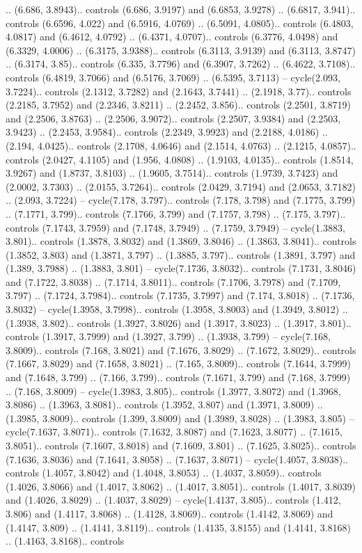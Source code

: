 .. (6.686, 3.8943).. controls (6.686, 3.9197) and (6.6853, 3.9278) .. (6.6817, 3.941).. controls (6.6596, 4.022) and (6.5916, 4.0769) .. (6.5091, 4.0805).. controls (6.4803, 4.0817) and (6.4612, 4.0792) .. (6.4371, 4.0707).. controls (6.3776, 4.0498) and (6.3329, 4.0006) .. (6.3175, 3.9388).. controls (6.3113, 3.9139) and (6.3113, 3.8747) .. (6.3174, 3.85).. controls (6.335, 3.7796) and (6.3907, 3.7262) .. (6.4622, 3.7108).. controls (6.4819, 3.7066) and (6.5176, 3.7069) .. (6.5395, 3.7113) -- cycle(2.093, 3.7224).. controls (2.1312, 3.7282) and (2.1643, 3.7441) .. (2.1918, 3.77).. controls (2.2185, 3.7952) and (2.2346, 3.8211) .. (2.2452, 3.856).. controls (2.2501, 3.8719) and (2.2506, 3.8763) .. (2.2506, 3.9072).. controls (2.2507, 3.9384) and (2.2503, 3.9423) .. (2.2453, 3.9584).. controls (2.2349, 3.9923) and (2.2188, 4.0186) .. (2.194, 4.0425).. controls (2.1708, 4.0646) and (2.1514, 4.0763) .. (2.1215, 4.0857).. controls (2.0427, 4.1105) and (1.956, 4.0808) .. (1.9103, 4.0135).. controls (1.8514, 3.9267) and (1.8737, 3.8103) .. (1.9605, 3.7514).. controls (1.9739, 3.7423) and (2.0002, 3.7303) .. (2.0155, 3.7264).. controls (2.0429, 3.7194) and (2.0653, 3.7182) .. (2.093, 3.7224) -- cycle(7.178, 3.797).. controls (7.178, 3.798) and (7.1775, 3.799) .. (7.1771, 3.799).. controls (7.1766, 3.799) and (7.1757, 3.798) .. (7.175, 3.797).. controls (7.1743, 3.7959) and (7.1748, 3.7949) .. (7.1759, 3.7949) -- cycle(1.3883, 3.801).. controls (1.3878, 3.8032) and (1.3869, 3.8046) .. (1.3863, 3.8041).. controls (1.3852, 3.803) and (1.3871, 3.797) .. (1.3885, 3.797).. controls (1.3891, 3.797) and (1.389, 3.7988) .. (1.3883, 3.801) -- cycle(7.1736, 3.8032).. controls (7.1731, 3.8046) and (7.1722, 3.8038) .. (7.1714, 3.8011).. controls (7.1706, 3.7978) and (7.1709, 3.797) .. (7.1724, 3.7984).. controls (7.1735, 3.7997) and (7.174, 3.8018) .. (7.1736, 3.8032) -- cycle(1.3958, 3.7998).. controls (1.3958, 3.8003) and (1.3949, 3.8012) .. (1.3938, 3.802).. controls (1.3927, 3.8026) and (1.3917, 3.8023) .. (1.3917, 3.801).. controls (1.3917, 3.7999) and (1.3927, 3.799) .. (1.3938, 3.799) -- cycle(7.168, 3.8009).. controls (7.168, 3.8021) and (7.1676, 3.8029) .. (7.1672, 3.8029).. controls (7.1667, 3.8029) and (7.1658, 3.8021) .. (7.165, 3.8009).. controls (7.1644, 3.7999) and (7.1648, 3.799) .. (7.166, 3.799).. controls (7.1671, 3.799) and (7.168, 3.7999) .. (7.168, 3.8009) -- cycle(1.3983, 3.805).. controls (1.3977, 3.8072) and (1.3968, 3.8086) .. (1.3963, 3.8081).. controls (1.3952, 3.807) and (1.3971, 3.8009) .. (1.3985, 3.8009).. controls (1.399, 3.8009) and (1.3989, 3.8028) .. (1.3983, 3.805) -- cycle(7.1637, 3.8071).. controls (7.1632, 3.8087) and (7.1623, 3.8077) .. (7.1615, 3.8051).. controls (7.1607, 3.8018) and (7.1609, 3.801) .. (7.1625, 3.8025).. controls (7.1636, 3.8036) and (7.1641, 3.8058) .. (7.1637, 3.8071) -- cycle(1.4057, 3.8038).. controls (1.4057, 3.8042) and (1.4048, 3.8053) .. (1.4037, 3.8059).. controls (1.4026, 3.8066) and (1.4017, 3.8062) .. (1.4017, 3.8051).. controls (1.4017, 3.8039) and (1.4026, 3.8029) .. (1.4037, 3.8029) -- cycle(1.4137, 3.805).. controls (1.412, 3.806) and (1.4117, 3.8068) .. (1.4128, 3.8069).. controls (1.4142, 3.8069) and (1.4147, 3.809) .. (1.4141, 3.8119).. controls (1.4135, 3.8155) and (1.4141, 3.8168) .. (1.4163, 3.8168).. controls 